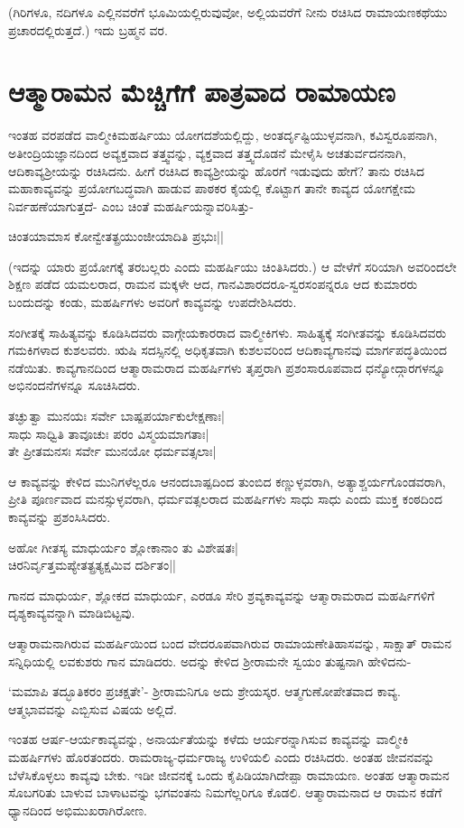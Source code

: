 (ಗಿರಿಗಳೂ, ನದಿಗಳೂ ಎಲ್ಲಿನವರೆಗೆ ಭೂಮಿಯಲ್ಲಿರುವುವೋ, ಅಲ್ಲಿಯವರೆಗೆ ನೀನು ರಚಿಸಿದ ರಾಮಾಯಣಕಥೆಯು ಪ್ರಚಾರದಲ್ಲಿರುತ್ತದೆ.) ಇದು ಬ್ರಹ್ಮನ ವರ. 

\section*{ಆತ್ಮಾರಾಮನ ಮೆಚ್ಚಿಗೆಗೆ ಪಾತ್ರವಾದ ರಾಮಾಯಣ} 

ಇಂತಹ ವರಪಡೆದ ವಾಲ್ಮೀಕಿಮಹರ್ಷಿಯು ಯೋಗದಶೆಯಲ್ಲಿದ್ದು, ಅಂತರ್ದೃಷ್ಟಿಯುಳ್ಳವನಾಗಿ, ಕವಿಸ್ವರೂಪನಾಗಿ, ಅತೀಂದ್ರಿಯಜ್ಞಾನದಿಂದ ಅವ್ಯಕ್ತವಾದ ತತ್ತ್ವವನ್ನು, ವ್ಯಕ್ತವಾದ ತತ್ತ್ವದೊಡನೆ ಮೇಳೈಸಿ ಅಚತುರ್ವದನನಾಗಿ, ಆದಿಕಾವ್ಯಶ್ರೀಯನ್ನು ರಚಿಸಿದನು. ಹೀಗೆ ರಚಿಸಿದ ಕಾವ್ಯಶ್ರೀಯನ್ನು ಹೊರಗೆ ಇಡುವುದು ಹೇಗೆ? ತಾನು ರಚಿಸಿದ ಮಹಾಕಾವ್ಯವನ್ನು ಪ್ರಯೋಗಬದ್ಧವಾಗಿ ಹಾಡುವ ಪಾಠಕರ ಕೈಯಲ್ಲಿ ಕೊಟ್ಟಾಗ ತಾನೇ ಕಾವ್ಯದ ಯೋಗಕ್ಷೇಮ ನಿರ್ವಹಣೆಯಾಗುತ್ತದೆ- ಎಂಬ ಚಿಂತೆ ಮಹರ್ಷಿಯನ್ನಾವರಿಸಿತ್ತು- 

\begin{shloka} 
ಚಿಂತಯಾಮಾಸ ಕೋನ್ವೇತತ್ಪ್ರಯುಂಜೀಯಾದಿತಿ ಪ್ರಭುಃ||
\end{shloka} 

(ಇದನ್ನು ಯಾರು ಪ್ರಯೋಗಕ್ಕೆ ತರಬಲ್ಲರು ಎಂದು ಮಹರ್ಷಿಯು ಚಿಂತಿಸಿದರು.) ಆ ವೇಳೆಗೆ ಸರಿಯಾಗಿ ಅವರಿಂದಲೇ ಶಿಕ್ಷಣ ಪಡೆದ ಯಮಲರಾದ, ರಾಮನ ಮಕ್ಕಳೇ ಆದ, ಗಾನವಿಶಾರದರೂ-ಸ್ವರಸಂಪನ್ನರೂ ಆದ ಕುಮಾರರು ಬಂದುದನ್ನು ಕಂಡು, ಮಹರ್ಷಿಗಳು ಅವರಿಗೆ ಕಾವ್ಯವನ್ನು ಉಪದೇಶಿಸಿದರು. 

ಸಂಗೀತಕ್ಕೆ ಸಾಹಿತ್ಯವನ್ನು ಕೂಡಿಸಿದವರು ವಾಗ್ಗೇಯಕಾರರಾದ ವಾಲ್ಮೀಕಿಗಳು. ಸಾಹಿತ್ಯಕ್ಕೆ ಸಂಗೀತವನ್ನು ಕೂಡಿಸಿದವರು ಗಮಕಿಗಳಾದ ಕುಶಲವರು. ಋಷಿ ಸದಸ್ಸಿನಲ್ಲಿ ಅಧಿಕೃತವಾಗಿ ಕುಶಲವರಿಂದ ಆದಿಕಾವ್ಯಗಾನವು ಮಾರ್ಗಪದ್ಧತಿಯಿಂದ ನಡೆಯಿತು. ಕಾವ್ಯಗಾನದಿಂದ ಆತ್ಮಾರಾಮರಾದ ಮಹರ್ಷಿಗಳು ತೃಪ್ತರಾಗಿ ಪ್ರಶಂಸಾರೂಪವಾದ ಧನ್ಯೋದ್ಗಾರಗಳನ್ನೂ ಅಭಿನಂದನೆಗಳನ್ನೂ ಸೂಚಿಸಿದರು. 

\begin{shloka} 
ತಚ್ಘುತ್ವಾ ಮುನಯಃ ಸರ್ವೇ ಬಾಷ್ಪಪರ್ಯಾಕುಲೇಕ್ಷಣಾಃ|\\ 
ಸಾಧು ಸಾಧ್ವಿತಿ ತಾವೂಚುಃ ಪರಂ ವಿಸ್ಮಯಮಾಗತಾಃ|\\ 
ತೇ ಪ್ರೀತಮನಸಃ ಸರ್ವೇ ಮುನಯೋ ಧರ್ಮವತ್ಸಲಾಃ|
\end{shloka} 

ಆ ಕಾವ್ಯವನ್ನು ಕೇಳಿದ ಮುನಿಗಳೆಲ್ಲರೂ ಆನಂದಬಾಷ್ಪದಿಂದ ತುಂಬಿದ ಕಣ್ಣುಳ್ಳವರಾಗಿ, ಅತ್ಯಾಶ್ಚರ್ಯಗೊಂಡವರಾಗಿ, ಪ್ರೀತಿ ಪೂರ್ಣವಾದ ಮನಸ್ಸುಳ್ಳವರಾಗಿ, ಧರ್ಮವತ್ಸಲರಾದ ಮಹರ್ಷಿಗಳು ಸಾಧು ಸಾಧು ಎಂದು ಮುಕ್ತ ಕಂಠದಿಂದ ಕಾವ್ಯವನ್ನು ಪ್ರಶಂಸಿಸಿದರು. 

\begin{shloka} 
ಅಹೋ ಗೀತಸ್ಯ ಮಾಧುರ್ಯಂ ಶ್ಲೋಕಾನಾಂ ತು ವಿಶೇಷತಃ|\\ 
ಚಿರನಿರ್ವೃತ್ತಮಪ್ಯೇತತ್ಪ್ರತ್ಯಕ್ಷಮಿವ ದರ್ಶಿತಂ||
\end{shloka} 

ಗಾನದ ಮಾಧುರ್ಯ, ಶ್ಲೋಕದ ಮಾಧುರ್ಯ, ಎರಡೂ ಸೇರಿ ಶ್ರವ್ಯಕಾವ್ಯವನ್ನು ಆತ್ಮಾರಾಮರಾದ ಮಹರ್ಷಿಗಳಿಗೆ ದೃಶ್ಯಕಾವ್ಯವನ್ನಾಗಿ ಮಾಡಿಬಿಟ್ಟವು. 

ಆತ್ಮಾರಾಮನಾಗಿರುವ ಮಹರ್ಷಿಯಿಂದ ಬಂದ ವೇದರೂಪವಾಗಿರುವ ರಾಮಾಯಣೇತಿಹಾಸವನ್ನು, ಸಾಕ್ಷಾತ್‍ ರಾಮನ ಸನ್ನಿಧಿಯಲ್ಲಿ ಲವಕುಶರು ಗಾನ ಮಾಡಿದರು. ಅದನ್ನು ಕೇಳಿದ ಶ್ರೀರಾಮನೇ ಸ್ವಯಂ ತುಷ್ಟನಾಗಿ ಹೇಳಿದನು- 

`ಮಮಾಪಿ ತದ್ಭೂತಿಕರಂ ಪ್ರಚಕ್ಷತೇ'- ಶ್ರೀರಾಮನಿಗೂ ಅದು ಶ್ರೇಯಸ್ಕರ. ಆತ್ಮಗುಣೋಪೇತವಾದ ಕಾವ್ಯ. ಆತ್ಮಭಾವವನ್ನು ಎಬ್ಬಿಸುವ ವಿಷಯ ಅಲ್ಲಿದೆ. 

ಇಂತಹ ಆರ್ಷ-ಆರ್ಯಕಾವ್ಯವನ್ನು, ಅನಾರ್ಯತೆಯನ್ನು ಕಳೆದು ಆರ್ಯರನ್ನಾಗಿಸುವ ಕಾವ್ಯವನ್ನು ವಾಲ್ಮೀಕಿ ಮಹರ್ಷಿಗಳು ಹೊರತಂದರು. ರಾಮರಾಜ್ಯ-ಧರ್ಮರಾಜ್ಯ ಉಳಿಯಲಿ ಎಂದು ರಚಿಸಿದರು. ಅಂತಹ ಜೀವನವನ್ನು ಬೆಳೆಸಿಕೊಳ್ಳಲು ಕಾವ್ಯವು ಬೇಕು. ಇಡೀ ಜೀವನಕ್ಕೆ ಒಂದು ಕೈಪಿಡಿಯಾಗಿದೇಪ್ಪಾ ರಾಮಾಯಣ. ಅಂತಹ ಆತ್ಮಾರಾಮನ ಸೊಬಗರಿತು ಬಾಳುವ ಬಾಳಾಟವನ್ನು ಭಗವಂತನು ನಿಮಗೆಲ್ಲರಿಗೂ ಕೊಡಲಿ. ಆತ್ಮಾರಾಮನಾದ ಆ ರಾಮನ ಕಡೆಗೆ ಧ್ಯಾನದಿಂದ ಅಭಿಮುಖರಾಗಿರೋಣ. 
